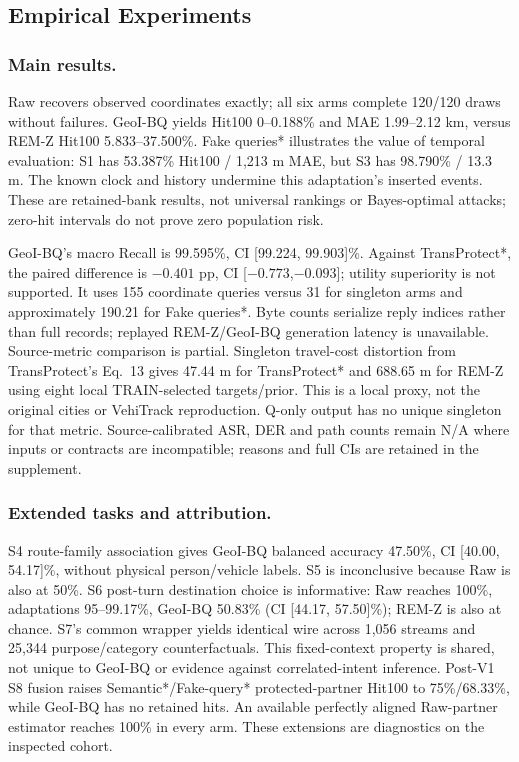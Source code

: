 \subsection{Empirical Experiments}
\subsubsection{Main results.}


Raw recovers observed coordinates exactly; all six arms complete 120/120 draws
without failures. GeoI-BQ yields Hit100 0--0.188\% and MAE 1.99--2.12 km,
versus REM-Z Hit100 5.833--37.500\%.
Fake queries* illustrates the value of temporal evaluation: S1 has
53.387\% Hit100 / 1,213 m MAE, but S3 has 98.790\% / 13.3 m.
The known clock and history undermine this adaptation's inserted events.
These are retained-bank results, not universal rankings or Bayes-optimal attacks;
zero-hit intervals do not prove zero population risk.

GeoI-BQ's macro Recall is 99.595\%, CI [99.224, 99.903]\%.
Against TransProtect*, the paired difference is $-0.401$ pp,
CI [$-0.773$,$-0.093$]; utility superiority is not supported.
It uses 155 coordinate queries versus 31 for singleton arms and approximately
190.21 for Fake queries*. Byte counts serialize reply indices rather than full
records; replayed REM-Z/GeoI-BQ generation latency is unavailable.
Source-metric comparison is partial. Singleton travel-cost distortion from
TransProtect's Eq.~13 gives 47.44 m for TransProtect* and 688.65 m for REM-Z
using eight local TRAIN-selected targets/prior. This is a local proxy, not the
original cities or VehiTrack reproduction. Q-only output has no unique
singleton for that metric. Source-calibrated ASR, DER and path counts remain
N/A where inputs or contracts are incompatible; reasons and full CIs are retained
in the supplement.

\subsubsection{Extended tasks and attribution.}
S4 route-family association gives GeoI-BQ balanced accuracy 47.50\%,
CI [40.00, 54.17]\%, without physical person/vehicle labels.
S5 is inconclusive because Raw is also at 50\%.
S6 post-turn destination choice is informative: Raw reaches 100\%,
adaptations 95--99.17\%, GeoI-BQ 50.83\%
(CI [44.17, 57.50]\%); REM-Z is also at chance.
S7's common wrapper yields identical wire across 1,056 streams and 25,344
purpose/category counterfactuals. This fixed-context property is shared,
not unique to GeoI-BQ or evidence against correlated-intent inference.
Post-V1 S8 fusion raises Semantic*/Fake-query* protected-partner Hit100 to
75\%/68.33\%, while GeoI-BQ has no retained hits.
An available perfectly aligned Raw-partner estimator reaches 100\% in every arm.
These extensions are diagnostics on the inspected cohort.


